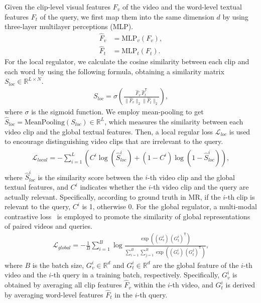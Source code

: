 Given the clip-level visual features  $F_v$ of the video and the word-level textual features $F_t$  of the query, we first map them into the same dimension $d$ by using three-layer multilayer perceptions (MLP).
\begin{align}
    \widehat{F}_v & = \text{MLP}_v(F_v), \\
    \widehat{F}_t & = \text{MLP}_t(F_t).
\end{align}
For the local regulator, we calculate the cosine similarity between each clip and each word by using the following formula, obtaining a similarity matrix $S_{loc} \in\mathbb{R}^{L\times N}$.
\begin{align}
    S_{loc} = \sigma \left( \frac{\widehat{F}_{v} \, \widehat{F}_{t}^{\mathsf{T}}}{\|\widehat{F}_{v}\|_{2} \|\widehat{F}_{t}\|_{2}} \right),
\end{align}
where $\sigma$ is the sigmoid function. We employ mean-pooling to get $\widehat{S}_{loc} = \text{MeanPooling}(S_{loc}) \in \mathbb{R}^L$,  which measures the similarity between each video clip and the global textual features. Then, a local regular loss $\mathcal{L}_{loc}$ is used to encourage distinguishing video clips that are irrelevant to the query.
\begin{align}
\begin{aligned}
    \mathcal{L}_{local} = -\sum_{i=1}^{L} \left( C^{i} \log(\widehat{S}^{i}_{loc}) + (1 - C^{i}) \log(1 - \widehat{S}^{i}_{loc}) \right),
\end{aligned}
\end{align}
where $\widehat{S}^i_{loc}$ is the similarity score between the $i$-th video clip and the global textual features, and $C^i$ indicates whether the $i$-th video clip and the query are actually relevant. Specifically, according to ground truth in MR, if the $i$-th clip is relevant to the query,  $C^i$ is 1, otherwise 0.
For the global regulator, a multi-modal contrastive loss~\cite{li2021align} is employed to promote the similarity of global representations of paired videos and queries.
\begin{align}
    \mathcal{L}_{global} = -\frac{1}{B}\sum_{i=1}^{B}\log\frac{\exp( (G_v^i) \, (G_t^i)^{\mathsf{T}})}{\sum_{i=1}^{B}\sum_{j=1}^{B}\exp((G_v^i) \, (G_t^j)^{\mathsf{T}})},
\end{align}
where $B$ is the batch size,  $G_v^i \in \mathbb{R}^d$ and $G_t^i \in \mathbb{R}^d$ are the global feature of the $i$-th video and the $i$-th query in a training batch, respectively. Specifically, $G_v^i$ is obtained by averaging all clip features $\widehat{F}_v$ within the $i$-th video, and $G_t^i$ is derived by averaging word-level features $\widehat{F}_t$ in the $i$-th query.

